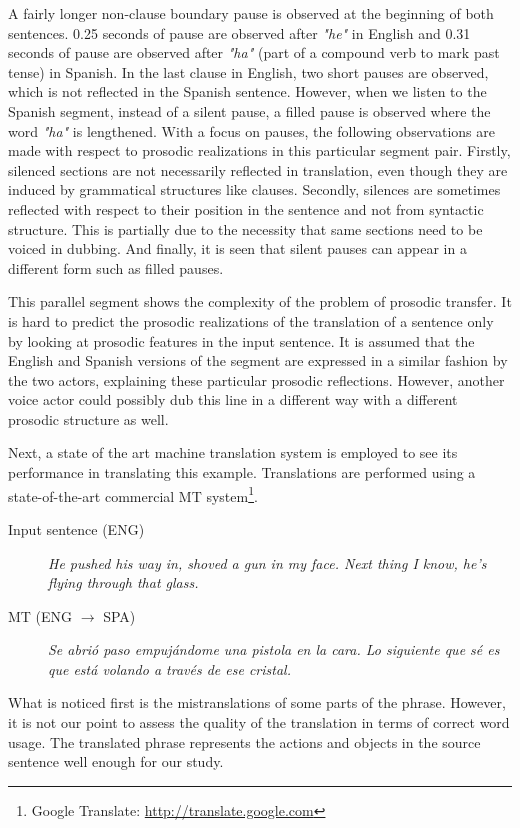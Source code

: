 A fairly longer non-clause boundary pause is observed at the beginning of both sentences. 0.25 seconds of pause are observed after \textit{"he"} in English and 0.31 seconds of pause are observed after \textit{"ha"} (part of a compound verb to mark past tense) in Spanish. In the last clause in English, two short pauses are observed, which is not reflected in the Spanish sentence. However, when we listen to the Spanish segment, instead of a silent pause, a filled pause is observed where the word \textit{"ha"} is lengthened. 
With a focus on pauses, the following observations are made with respect to prosodic realizations in this particular segment pair. Firstly, silenced sections are not necessarily reflected in translation, even though they are induced by grammatical structures like clauses. Secondly, silences are sometimes reflected with respect to their position in the sentence and not from syntactic structure. This is partially due to the necessity that same sections need to be voiced in dubbing. And finally, it is seen that silent pauses can appear in a different form such as filled pauses. 

This parallel segment shows the complexity of the problem of prosodic transfer. It is hard to predict the prosodic realizations of the translation of a sentence only by looking at prosodic features in the input sentence. It is assumed that the English and Spanish versions of the segment are expressed in a similar fashion by the two actors, explaining these particular prosodic reflections. However, another voice actor could possibly dub this line in a different way with a different prosodic structure as well.  

Next, a state of the art machine translation system is employed to see its performance in translating this example. Translations are performed using a state-of-the-art commercial MT system\footnote{Google Translate: \url{http://translate.google.com}}.  

\begin{description}
\item [Input sentence (ENG)] {\it He pushed his way in, shoved a gun in my face. Next thing I know, he's flying through that glass.}
\item [MT (ENG $\rightarrow$ SPA)] {\it Se abrió paso empujándome una pistola en la cara. Lo siguiente que sé es que está volando a través de ese cristal.}
\end{description}

What is noticed first is the mistranslations of some parts of the phrase. However, it is not our point to assess the quality of the translation in terms of correct word usage. The translated phrase represents the actions and objects in the source sentence well enough for our study. 

